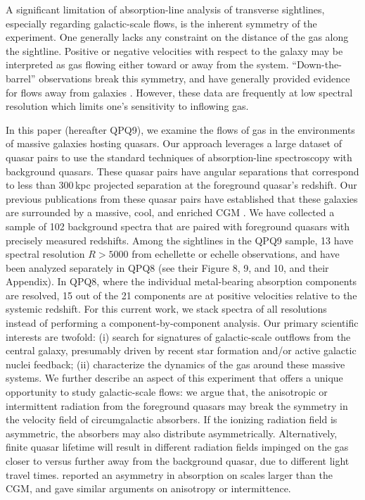 \documentclass[iop]{emulateapj}
\begin{document}
A significant limitation of absorption-line analysis of transverse sightlines, especially 
regarding galactic-scale flows, is the inherent symmetry of the experiment. One generally lacks 
any constraint on the distance of the gas along the sightline. Positive or negative velocities 
with respect to the galaxy may be interpreted as gas flowing either toward or away from the 
system. ``Down-the-barrel'' observations break this symmetry, and have generally provided evidence 
for flows away from galaxies \citep{Rupke+05,Martin05,Weiner+09,Rubin+14}. However, these data are 
frequently at low spectral resolution which limits one's sensitivity to inflowing gas. 
 
In this paper (hereafter QPQ9), we examine the flows of gas in the environments of massive 
galaxies hosting quasars. Our approach leverages a large dataset of quasar pairs 
\citep[][hereafter QPQ1]{QPQ1} to use the standard techniques of absorption-line spectroscopy 
with background quasars. These quasar pairs 
have angular separations that correspond to less than 300\,kpc projected separation at the 
foreground quasar's redshift. Our previous publications from these quasar pairs have established 
that these galaxies are surrounded by a massive, cool, and enriched CGM 
\citep[QPQ5, QPQ6, QPQ7:][]{QPQ5,QPQ6,QPQ7}. We have collected a sample of 102 background 
spectra that are paired with foreground quasars with precisely measured redshifts. Among the
sightlines in the QPQ9 sample, 13 have spectral resolution $R>5000$ from echellette or echelle
observations, and have been analyzed separately in QPQ8 (see their Figure 8, 9, and 10, and their 
Appendix). In QPQ8, where the individual metal-bearing absorption components are resolved, 15 out 
of the 21 components are at positive velocities relative to the systemic redshift. For this
current work, we stack spectra of all resolutions instead of performing a component-by-component
analysis. Our primary scientific interests are twofold: (i) search for signatures of galactic-scale
outflows from the central galaxy, presumably driven by recent star formation and/or active galactic
nuclei feedback; (ii) characterize the dynamics of the gas around these massive systems. We further
describe an aspect of this experiment that offers a unique opportunity to study galactic-scale
flows: we argue that, the anisotropic or intermittent radiation from the foreground quasars may
break the symmetry in the velocity field of circumgalactic absorbers. If the ionizing radiation
field is asymmetric, the absorbers may also distribute asymmetrically. Alternatively, finite quasar
lifetime will result in different radiation fields impinged on the gas closer to versus further
away from the background quasar, due to different light travel times. \cite{KirkmanTytler08}
reported an asymmetry in  absorption on scales larger than the CGM, and gave similar
arguments on anisotropy or intermittence.
\end{document}
